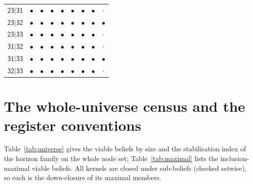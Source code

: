 \documentclass[11pt,a4paper]{article}
\theoremstyle{plain}
\theoremstyle{definition}
\theoremstyle{remark}
\newcommand{\st}[1]{\mathsf{#1}}
\begin{document}
\begin{table}[H]
\begin{tabular}{lcccccccc}
$\st{23|31}$ & $\bullet$ & $\bullet$ & $\bullet$ & $\bullet$ & $\bullet$ & $\bullet$ & $\bullet$ & $\cdot$ \\
$\st{23|32}$ & $\bullet$ & $\bullet$ & $\bullet$ & $\bullet$ & $\bullet$ & $\bullet$ & $\bullet$ & $\bullet$ \\
$\st{23|33}$ & $\bullet$ & $\bullet$ & $\bullet$ & $\bullet$ & $\bullet$ & $\bullet$ & $\bullet$ & $\cdot$ \\
$\st{31|32}$ & $\bullet$ & $\bullet$ & $\bullet$ & $\bullet$ & $\bullet$ & $\bullet$ & $\bullet$ & $\cdot$ \\
$\st{31|33}$ & $\bullet$ & $\bullet$ & $\bullet$ & $\bullet$ & $\bullet$ & $\bullet$ & $\bullet$ & $\bullet$ \\
$\st{32|33}$ & $\bullet$ & $\bullet$ & $\bullet$ & $\bullet$ & $\bullet$ & $\bullet$ & $\bullet$ & $\cdot$ \\
\bottomrule
\end{tabular}
\end{table}
\section{The whole-universe census and the register conventions}\label{si:universe}

Table~\ref{tab:universe} gives the viable beliefs by size and the stabilisation index of the horizon family on the whole node set; Table~\ref{tab:maximal} lists the inclusion-maximal viable beliefs. All kernels are closed under sub-beliefs (checked setwise), so each is the down-closure of its maximal members.
\end{document}
